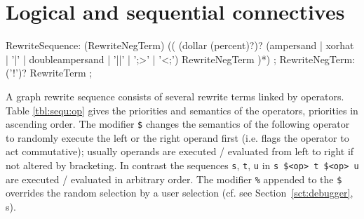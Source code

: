 \section{Logical and sequential connectives}

\makeatletter

\begin{rail}
  RewriteSequence: 
    (RewriteNegTerm) (( (dollar (percent)?)? (ampersand | xorhat | '|' | doubleampersand | '||' | ';>' | '<;') RewriteNegTerm )*)
	;
  RewriteNegTerm: 
    ('!')? RewriteTerm
	;
\end{rail}

A graph rewrite sequence consists of several rewrite terms linked by operators.
Table \ref{tbl:sequ:op} gives the priorities and semantics of the operators, priorities in ascending order.
The modifier \texttt{\$} changes the semantics of the following operator to randomly execute the left or the right operand first (i.e. flags the operator to act commutative);
usually operands are executed / evaluated from left to right if not altered by bracketing.
In contrast the sequences \texttt{s}, \texttt{t}, \texttt{u} in \texttt{s \$<op> t \$<op> u} are executed / evaluated in arbitrary order.
The modifier \texttt{\%} appended to the \texttt{\$} overrides the random selection by a user selection (cf. see Section~\ref{sct:debugger}, s).

